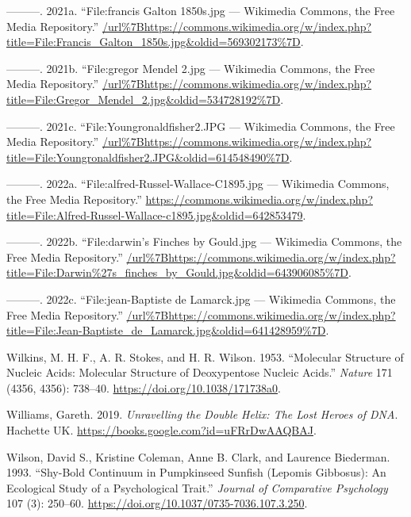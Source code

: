 \documentclass[
]{book}
\newlength{\cslhangindent}
\newlength{\cslentryspacingunit} %
\newenvironment{CSLReferences}[2] %
 {%
  \setlength{\parindent}{0pt}
  \ifodd #1
  \let\oldpar\par
  \def\par{\hangindent=\cslhangindent\oldpar}
  \fi
  \setlength{\parskip}{#2\cslentryspacingunit}
 }%
 {}
\begin{document}
\begin{CSLReferences}{1}{0}
\leavevmode{}%
---------. 2021a. {``File:francis Galton 1850s.jpg --- Wikimedia Commons{,} the Free Media Repository.''} \url{/url\%7Bhttps://commons.wikimedia.org/w/index.php?title=File:Francis_Galton_1850s.jpg\&oldid=569302173\%7D}.

\leavevmode{}%
---------. 2021b. {``File:gregor Mendel 2.jpg --- Wikimedia Commons{,} the Free Media Repository.''} \url{/url\%7Bhttps://commons.wikimedia.org/w/index.php?title=File:Gregor_Mendel_2.jpg\&oldid=534728192\%7D}.

\leavevmode{}%
---------. 2021c. {``File:Youngronaldfisher2.JPG --- Wikimedia Commons{,} the Free Media Repository.''} \url{/url\%7Bhttps://commons.wikimedia.org/w/index.php?title=File:Youngronaldfisher2.JPG\&oldid=614548490\%7D}.

\leavevmode{}%
---------. 2022a. {``File:alfred-Russel-Wallace-C1895.jpg --- Wikimedia Commons{,} the Free Media Repository.''} \url{https://commons.wikimedia.org/w/index.php?title=File:Alfred-Russel-Wallace-c1895.jpg\&oldid=642853479}.

\leavevmode{}%
---------. 2022b. {``File:darwin's Finches by Gould.jpg --- Wikimedia Commons{,} the Free Media Repository.''} \url{/url\%7Bhttps://commons.wikimedia.org/w/index.php?title=File:Darwin\%27s_finches_by_Gould.jpg\&oldid=643906085\%7D}.

\leavevmode{}%
---------. 2022c. {``File:jean-Baptiste de Lamarck.jpg --- Wikimedia Commons{,} the Free Media Repository.''} \url{/url\%7Bhttps://commons.wikimedia.org/w/index.php?title=File:Jean-Baptiste_de_Lamarck.jpg\&oldid=641428959\%7D}.

\leavevmode{}%
Wilkins, M. H. F., A. R. Stokes, and H. R. Wilson. 1953. {``Molecular {Structure} of {Nucleic Acids}: {Molecular Structure} of {Deoxypentose Nucleic Acids}.''} \emph{Nature} 171 (4356, 4356): 738--40. \url{https://doi.org/10.1038/171738a0}.

\leavevmode{}%
Williams, Gareth. 2019. \emph{Unravelling the {Double Helix}: {The Lost Heroes} of {DNA}}. {Hachette UK}. \url{https://books.google.com?id=uFRrDwAAQBAJ}.

\leavevmode{}%
Wilson, David S., Kristine Coleman, Anne B. Clark, and Laurence Biederman. 1993. {``Shy-Bold Continuum in Pumpkinseed Sunfish ({Lepomis} Gibbosus): {An} Ecological Study of a Psychological Trait.''} \emph{Journal of Comparative Psychology} 107 (3): 250--60. \url{https://doi.org/10.1037/0735-7036.107.3.250}.


\end{CSLReferences}
\end{document}
